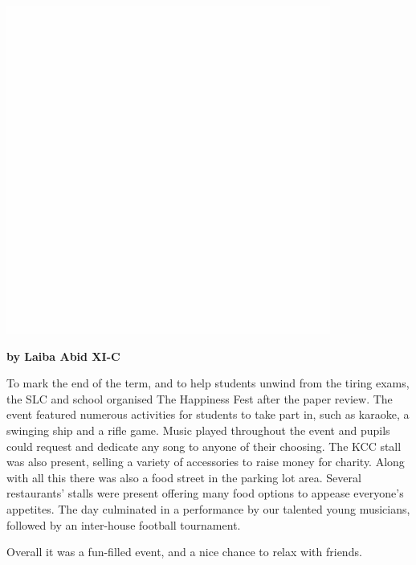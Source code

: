 \documentclass{article}
\begin{document}
\begin{multicols}{2}
\includegraphics[scale=0.1]{w}





\textbf{by Laiba Abid XI-C}


To mark the end of the term, and to help students unwind from the tiring exams, the SLC and school organised The Happiness Fest after the paper review. The event featured numerous activities for students to take part in, such as karaoke, a swinging ship and a rifle game. Music played throughout the event and pupils could request and dedicate any song to anyone of their choosing. The KCC stall was also present, selling a variety of accessories to raise money for charity. Along with all this there was also a food street in the parking lot area. Several restaurants' stalls were present offering many food options to appease everyone’s appetites. The day culminated in a performance by our talented young musicians, followed by an inter-house football tournament. 

Overall it was a fun-filled event, and a nice chance to relax with friends.



\end{multicols}
\pagebreak 
\end{document}
